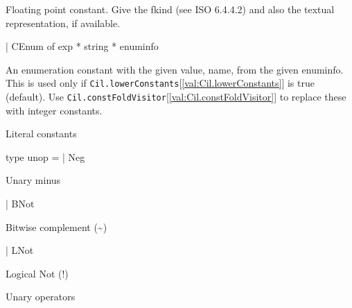 \documentclass[11pt]{article}
\begin{document}
\begin{ocamldoccomment}
Floating point constant. Give the fkind (see ISO 6.4.4.2) and also 
 the textual representation, if available.
\end{ocamldoccomment}
\begin{ocamldoccode}
  | CEnum of exp * string * enuminfo
\end{ocamldoccode}
\begin{ocamldoccomment}
An enumeration constant with the given value, name, from the given 
 enuminfo. This is used only if {\tt{Cil.lowerConstants}}[\ref{val:Cil.lowerConstants}] is true 
 (default). Use {\tt{Cil.constFoldVisitor}}[\ref{val:Cil.constFoldVisitor}] to replace these with integer 
 constants.
\end{ocamldoccomment}
\begin{ocamldocdescription}
Literal constants


\end{ocamldocdescription}




\label{type:Cil.unop}\begin{ocamldoccode}
type unop =
  | Neg
\end{ocamldoccode}
\begin{ocamldoccomment}
Unary minus
\end{ocamldoccomment}
\begin{ocamldoccode}
  | BNot
\end{ocamldoccode}
\begin{ocamldoccomment}
Bitwise complement (\~{})
\end{ocamldoccomment}
\begin{ocamldoccode}
  | LNot
\end{ocamldoccode}
\begin{ocamldoccomment}
Logical Not (!)
\end{ocamldoccomment}
\begin{ocamldocdescription}
Unary operators


\end{ocamldocdescription}
\end{document}
